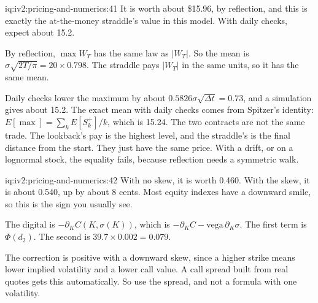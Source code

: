 \begin{solution}{iq:iv2:pricing-and-numerics:41}
It is worth about \$15.96, by reflection, and this is exactly the at-the-money straddle's value in this model. With daily checks, expect about 15.2.

By reflection, $\max W_T$ has the same law as $|W_T|$. So the mean is $\sigma\sqrt{2T/\pi} = 20 \times 0.798$. The straddle pays $|W_T|$ in the same units, so it has the same mean.

Daily checks lower the maximum by about $0.5826\sigma\sqrt{\Delta t} = 0.73$, and a simulation gives about 15.2. The exact mean with daily checks comes from Spitzer's identity: $E[\max] = \sum_k E[S_k^+]/k$, which is 15.24. The two contracts are not the same trade. The lookback's pay is the highest level, and the straddle's is the final distance from the start. They just have the same price. With a drift, or on a lognormal stock, the equality fails, because reflection needs a symmetric walk.

\end{solution}

\begin{solution}{iq:iv2:pricing-and-numerics:42}
With no skew, it is worth 0.460. With the skew, it is about 0.540, up by about 8 cents. Most equity indexes have a downward smile, so this is the sign you usually see.

The digital is $-\partial_KC(K, \sigma(K))$, which is $-\partial_KC - \text{vega}\,\partial_K\sigma$. The first term is $\Phi(d_2)$. The second is $39.7 \times 0.002 = 0.079$.

The correction is positive with a downward skew, since a higher strike means lower implied volatility and a lower call value. A call spread built from real quotes gets this automatically. So use the spread, and not a formula with one volatility.

\end{solution}

